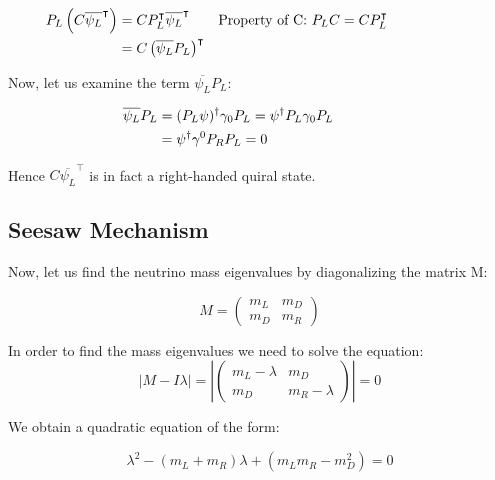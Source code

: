 \begin{align}
  &\begin{aligned}
     \mathllap{P_L \left( C \overline{\psi_L}^\intercal \right)} &= C P_L^\intercal \overline{\psi_L}^\intercal &\text{Property of C: $P_LC = C P_L^\intercal$}\\        
     \mathllap{} &= C \left( \overline{\psi_L}P_L \right)^\intercal  
  &\end{aligned}
\end{align}

Now, let us examine the term $\overline{\psi_L}P_L$:
 

\begin{align}
  &\begin{aligned}
    \mathllap{\overline{\psi_L}P_L} &= (P_L \psi)^\dagger \gamma_0 P_L = \psi^\dagger P_L \gamma_0 P_L\\
    \mathllap{} &= \psi^\dagger \gamma^0 P_R P_L = 0
    &\end{aligned}
\end{align}

Hence $C \overline{\psi_L}^\intercal$ is in fact a right-handed quiral state. 
\\

\subsection{Seesaw Mechanism}

Now, let us find the neutrino mass eigenvalues by diagonalizing the matrix M:

\begin{equation}
M = 
  \begin{pmatrix}
  m_L & m_D \\
  m_D & m_R  
  \end{pmatrix}
\end{equation}

In order to find the mass eigenvalues we need to solve the equation:
\begin{equation}
\left| M - I \lambda \right|  = \left| \begin{pmatrix}
  m_L - \lambda & m_D \\
  m_D & m_R - \lambda 
  \end{pmatrix} \right| = 0
\end{equation}

We obtain a quadratic equation of the form: 

\begin{equation}
\lambda ^2 - (m_L + m_R) \lambda + (m_L m_R - m_D^2) = 0
\end{equation}

